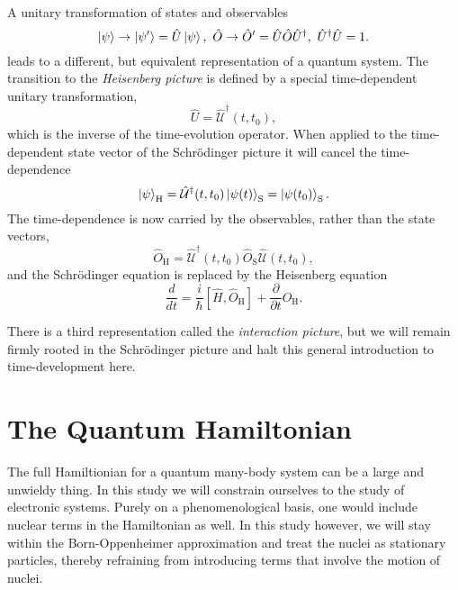     A unitary transformation of states and observables
    \begin{equation}
        \ket{\psi} \to \ket{\psi'} = \hat{U}\ket{\psi}, \ 
        \hat{O} \to \hat{O}' = \hat{U}\hat{O}\hat{U}^\dagger, \ 
        \hat{U}^\dagger\hat{U} = 1.
    \end{equation}
    leads to a different, but equivalent representation of a quantum system.
    The transition to the \emph{Heisenberg picture} is defined by a special
    time-dependent unitary transformation,
    \begin{equation}
        \hat{U} = \hat{\mathcal{U}}^\dagger(t, t_0),
    \end{equation}
    which is the inverse of the time-evolution operator. When applied to the 
    time-dependent state vector of the Schrödinger picture it will cancel 
    the time-dependence
    \begin{equation}
        \ket{\psi}_\text{H} 
        = \hat{\mathcal{U}}^\dagger(t, t_0) \ket{\psi(t)}_\text{S}
        = \ket{\psi(t_0)}_\text{S}.
    \end{equation}
    The time-dependence is now carried by the observables, rather than the state 
    vectors,
    \begin{equation}
        \hat{O}_\text{H} 
        = \hat{\mathcal{U}}^\dagger(t, t_0)
        \hat{O}_\text{S}
        \hat{\mathcal{U}}(t, t_0),
    \end{equation}
    and the Schrödinger equation is replaced by the Heisenberg equation
    \begin{equation}
        \frac{d}{dt} 
        = \frac{i}{\hbar}[\hat{H}, \hat{O}_\text{H}]
        + \frac{\partial}{\partial t} \hat{O}_\text{H}.
    \end{equation}

    There is a third representation called the \emph{interaction picture}, but we will 
    remain firmly rooted in the Schrödinger picture and halt this general introduction 
    to time-development here. 

\section{The Quantum Hamiltonian}

    The full Hamiltionian for a quantum many-body system can be a large 
    and unwieldy thing. In this study we will constrain ourselves to the study of
    electronic systems. Purely on a phenomenological basis, one would include nuclear
    terms in the Hamiltonian as well. In this study however, we will stay within the
    Born-Oppenheimer approximation and treat the nuclei as stationary particles, thereby
    refraining from introducing terms that involve the motion of nuclei.

